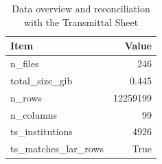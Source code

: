\begin{table}[t]
\centering
\caption{Data overview and reconciliation with the Transmittal Sheet}
\label{tab:table1_data_overview}
\small
\begin{tabular}{lr}
\toprule
Item & Value \\
\midrule
n\_files & 246 \\
total\_size\_gib & 0.445 \\
n\_rows & 12259199 \\
n\_columns & 99 \\
ts\_institutions & 4926 \\
ts\_matches\_lar\_rows & True \\
\bottomrule
\end{tabular}
\end{table}
